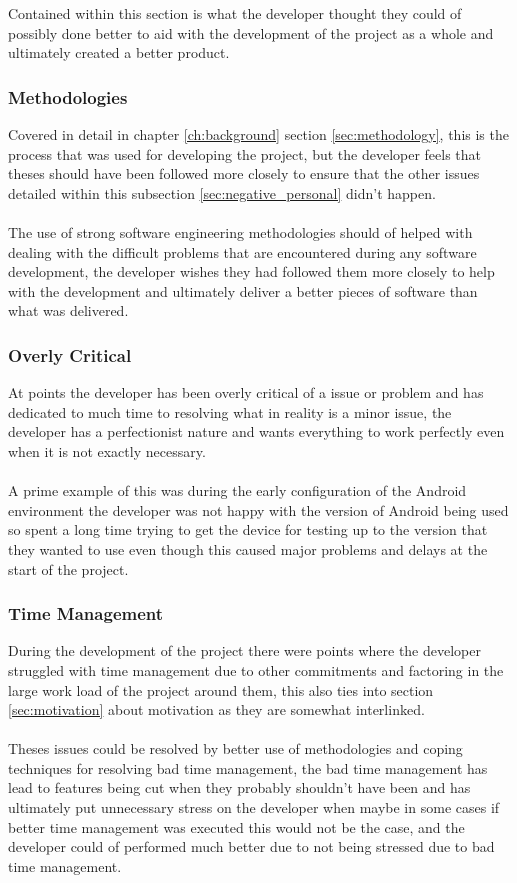 Contained within this section is what the developer thought they could of possibly done better to aid with the development of the project as a whole and ultimately created a better product. 

\subsubsection{Methodologies}

Covered in detail in chapter \ref{ch:background} section \ref{sec:methodology}, this is the process that was used for developing the project, but the developer feels that theses should have been followed more closely to ensure that the other issues detailed within this subsection \ref{sec:negative_personal} didn't happen.\\
\\
The use of strong software engineering methodologies should of helped with dealing with the difficult problems that are encountered during any software development, the developer wishes they had followed them more closely to help with the development and ultimately deliver a better pieces of software than what was delivered.

\subsubsection{Overly Critical}

At points the developer has been overly critical of a issue or problem and has dedicated to much time to resolving what in reality is a minor issue, the developer has a perfectionist nature and wants everything to work perfectly even when it is not exactly necessary.\\
\\
A prime example of this was during the early configuration of the Android environment the developer was not happy with the version of Android being used so spent a long time trying to get the device for testing up to the version that they wanted to use even though this caused major problems and delays at the start of the project.

\subsubsection{Time Management}
\label{sec:time_management}

During the development of the project there were points where the developer struggled with time management due to other commitments and factoring in the large work load of the project around them, this also ties into section \ref{sec:motivation} about motivation as they are somewhat interlinked.\\
\\
Theses issues could be resolved by better use of methodologies and coping techniques for resolving bad time management, the bad time management has lead to features being cut when they probably shouldn't have been and has ultimately put unnecessary stress on the developer when maybe in some cases if better time management was executed this would not be the case, and the developer could of performed much better due to not being stressed due to bad time management.

